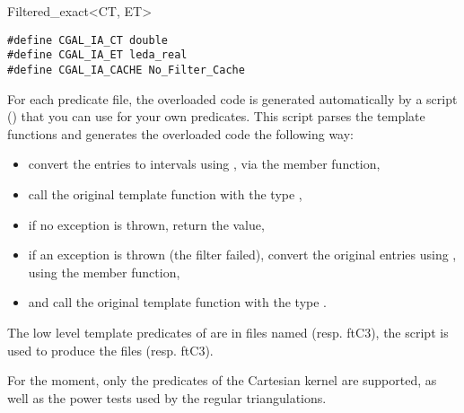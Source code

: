 \begin{ccClassTemplate}{Filtered_exact<CT, ET>}
\begin{verbatim} 
#define CGAL_IA_CT double
#define CGAL_IA_ET leda_real
#define CGAL_IA_CACHE No_Filter_Cache
\end{verbatim}

For each predicate file, the overloaded code is generated automatically by a
 script () that you can
use for your own predicates.
This script parses the template functions and generates the
overloaded code the following way:
\begin{itemize}
\item convert the entries to intervals using
    , via the  member function,
\item call the original template function with the type
    ,
\item if no exception is thrown, return the value,
\item if an exception is thrown (the filter failed), convert the original
    entries using , using the  member
    function,
\item and call the original template function with the type .
\end{itemize}

\ccExample

The low level template predicates of {\cgal} are in files named
 (resp. ftC3), the script is used
to produce the files 
(resp. ftC3).

For the moment, only the predicates of the Cartesian kernel are supported,
as well as the power tests used by the regular triangulations.

\end{ccClassTemplate}
